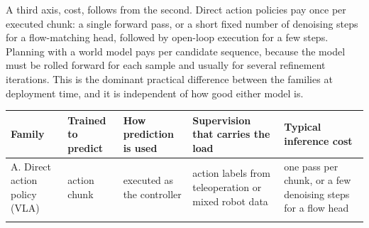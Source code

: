 \documentclass[
  10pt,
  english,
]{article}
\begin{document}
A third axis, cost, follows from the second. Direct action policies pay
once per executed chunk: a single forward pass, or a short fixed number
of denoising steps for a flow-matching head, followed by open-loop
execution for a few steps. Planning with a world model pays per
candidate sequence, because the model must be rolled forward for each
sample and usually for several refinement iterations. This is the
dominant practical difference between the families at deployment time,
and it is independent of how good either model is.

\begin{longtable}[]{@{}lllll@{}}
\toprule
\begin{minipage}[b]{0.17\columnwidth}\raggedright
Family\strut
\end{minipage} & \begin{minipage}[b]{0.17\columnwidth}\raggedright
Trained to predict\strut
\end{minipage} & \begin{minipage}[b]{0.17\columnwidth}\raggedright
How prediction is used\strut
\end{minipage} & \begin{minipage}[b]{0.17\columnwidth}\raggedright
Supervision that carries the load\strut
\end{minipage} & \begin{minipage}[b]{0.17\columnwidth}\raggedright
Typical inference cost\strut
\end{minipage}\tabularnewline
\midrule
\endhead
\begin{minipage}[t]{0.17\columnwidth}\raggedright
A. Direct action policy (VLA)\strut
\end{minipage} & \begin{minipage}[t]{0.17\columnwidth}\raggedright
action chunk\strut
\end{minipage} & \begin{minipage}[t]{0.17\columnwidth}\raggedright
executed as the controller\strut
\end{minipage} & \begin{minipage}[t]{0.17\columnwidth}\raggedright
action labels from teleoperation or mixed robot data\strut
\end{minipage} & \begin{minipage}[t]{0.17\columnwidth}\raggedright
one pass per chunk, or a few denoising steps for a flow head\strut
\end{minipage}\tabularnewline
\begin{minipage}[t]{0.17\columnwidth}\raggedright

\end{minipage}
\end{longtable}
\end{document}
